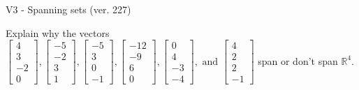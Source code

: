 \begin{exercise}
  \begin{exerciseTitle}V3 - Spanning sets (ver. 227)\end{exerciseTitle}
  \begin{exerciseStatement}
    Explain why the vectors \(\left[\begin{array}{r}
4 \\
3 \\
-2 \\
0
\end{array}\right] , \left[\begin{array}{r}
-5 \\
-2 \\
3 \\
1
\end{array}\right] , \left[\begin{array}{r}
-5 \\
3 \\
0 \\
-1
\end{array}\right] , \left[\begin{array}{r}
-12 \\
-9 \\
6 \\
0
\end{array}\right] , \left[\begin{array}{r}
0 \\
4 \\
-3 \\
-4
\end{array}\right] , \text{ and } \left[\begin{array}{r}
4 \\
2 \\
2 \\
-1
\end{array}\right]\) span or don't span \(\mathbb{R}^4\). 
	



\end{exerciseStatement}
\end{exercise}
